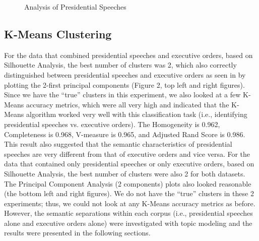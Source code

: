 \documentclass{article}
\begin{document}
{{{\begin{figure}[!htb]
	\caption{\label{fig:my-label1} Analysis of Presidential Speeches}
\end{figure}

}

\subsection{K-Means Clustering}{For the data that combined presidential speeches and executive orders, based on Silhouette Analysis, the best number of clusters was 2, which also correctly distinguished between presidential speeches and executive orders as seen in by plotting the 2-first principal components (Figure 2,  top left and right figures). Since we have the “true” clusters in this experiment, we also looked at a few K-Means accuracy metrics, which were all very high and indicated that the K-Means algorithm worked very well with this classification task (i.e., identifying presidential speeches vs. executive orders). The Homogeneity is 0.962, Completeness is 0.968, V-measure is 0.965, and Adjusted Rand Score is 0.986. This result also suggested that the semantic characteristics of presidential speeches are very different from that of executive orders and vice versa.
For the data that contained only presidential speeches or only executive orders, based on Silhouette Analysis, the best number of clusters were also 2 for both datasets. The Principal Component Analysis (2 components) plots also looked reasonable (the bottom left and right figures). We do not have the “true” clusters in these 2 experiments; thus, we could not look at any K-Means accuracy metrics as before. However, the semantic separations within each corpus (i.e., presidential speeches alone and executive orders alone) were investigated with topic modeling and the results were presented in the following sections.

}}}
\end{document}
